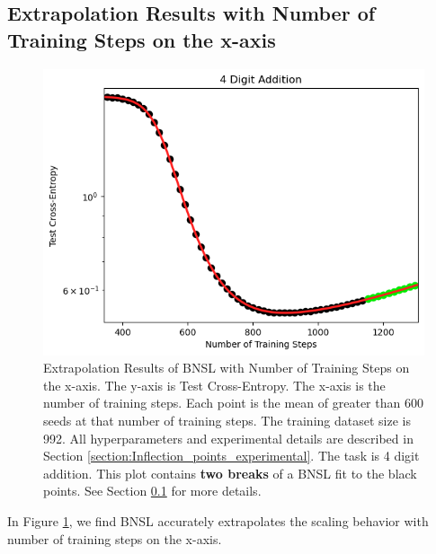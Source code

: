 \documentclass{article} %
\begin{document}
\FloatBarrier

\clearpage

\subsection{Extrapolation Results with Number of Training Steps on the x-axis}
\label{section:steps}

\vspace{-3.5mm}

\begin{figure}[htbp]
    \centering
\includegraphics[width=1.0\textwidth]{figures/num_steps/num_steps.png}

\vspace{-3.5mm}
    \caption{
Extrapolation Results of BNSL with Number of Training Steps on the x-axis. The y-axis is Test Cross-Entropy. The x-axis is the number of training steps. Each point is the mean of greater than 600 seeds at that number of training steps. The training dataset size is 992. All hyperparameters and experimental details are described in Section \ref{section:Inflection_points_experimental}. The task is 4 digit addition. This plot contains \textbf{two breaks} of a BNSL fit to the black points. See Section \ref{section:steps} for more details.
    }
    \label{fig:steps}
\end{figure}

In Figure \ref{fig:steps}, we find BNSL accurately extrapolates the scaling behavior with number of training steps on the x-axis.
\end{document}
